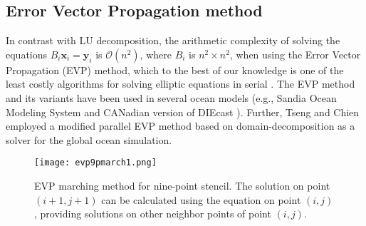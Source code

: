 \subsection{Error Vector Propagation method}
In contrast with LU decomposition, the arithmetic complexity of solving the equations $B_i \textbf{x}_i =\textbf{y}_i$ is $\mathcal{O}(n^2)$,
where $B_i$ is $n^2\times n^2$, when using the Error Vector
Propagation (EVP) method,
which to the best of our knowledge is one of the least costly algorithms
for solving elliptic equations in serial \cite{roache1995elliptic}.
The EVP method and its variants have been used in several ocean models
(e.g., Sandia Ocean Modeling System \cite{dietrich1987ocean} and
CANadian version of DIEcast \cite{sheng1998candie}).  Further, Tseng and Chien
\cite{tseng2011parallel} employed a modified parallel EVP
method based on domain-decomposition as a solver for the global ocean
simulation.

\begin {figure}[!t]
\centering
\texttt{[image: evp9pmarch1.png]}
\caption []{EVP marching method for nine-point stencil. The solution on point $(i+1,j+1)$ can be calculated using the equation on point $(i,j)$, providing solutions on other neighbor points of point $(i,j)$.  \label {fig:evp9p}}
\vspace{-.2in}
\end {figure}

